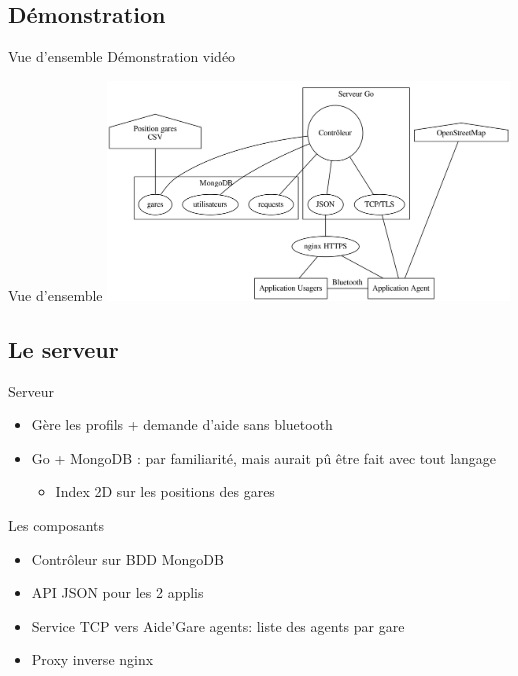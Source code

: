 \documentclass{beamer}
\begin{document}
\subsection{Démonstration}
\begin{frame}{Vue d'ensemble}
    Démonstration vidéo
\end{frame}
\begin{frame}{Vue d'ensemble}
    \includegraphics[width=0.8\textwidth]{general.png}
\end{frame}
\subsection{Le serveur}
\begin{frame}{Serveur}
    \begin{itemize}
        \item Gère les profils + demande d'aide sans bluetooth
        \item Go + MongoDB : par familiarité, mais aurait pû être fait avec tout langage
            \begin{itemize}
                \item Index 2D sur les positions des gares
            \end{itemize}
    \end{itemize}
    \begin{block}{Les composants}
        \begin{itemize}
            \item Contrôleur sur BDD MongoDB
            \item API JSON pour les 2 applis
            \item Service TCP vers Aide'Gare agents: liste des agents par gare
            \item Proxy inverse nginx
        \end{itemize}
    \end{block}
\end{frame}
\end{document}
